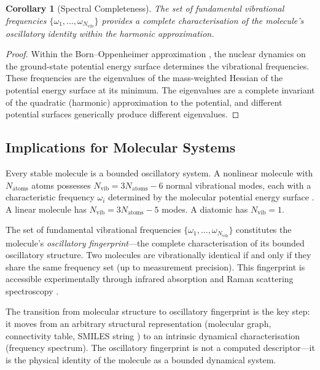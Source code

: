 \documentclass[11pt,a4paper]{article}
\newtheorem{corollary}[theorem]{Corollary}
\theoremstyle{definition}
\theoremstyle{remark}
\newcommand{\Nvib}{N_{\mathrm{vib}}}
\begin{document}
\begin{corollary}[Spectral Completeness]
\label{cor:spectral_complete}
The set of fundamental vibrational frequencies $\{\omega_1, \ldots, \omega_{\Nvib}\}$ provides a complete characterisation of the molecule's oscillatory identity within the harmonic approximation.
\end{corollary}

\begin{proof}
Within the Born--Oppenheimer approximation \citep{born1927}, the nuclear dynamics on the ground-state potential energy surface determines the vibrational frequencies. These frequencies are the eigenvalues of the mass-weighted Hessian of the potential energy surface at its minimum. The eigenvalues are a complete invariant of the quadratic (harmonic) approximation to the potential, and different potential surfaces generically produce different eigenvalues.
\end{proof}

\subsection{Implications for Molecular Systems}

Every stable molecule is a bounded oscillatory system. A nonlinear molecule with $N_{\mathrm{atoms}}$ atoms possesses $\Nvib = 3N_{\mathrm{atoms}} - 6$ normal vibrational modes, each with a characteristic frequency $\omega_i$ determined by the molecular potential energy surface \citep{wilson1955}. A linear molecule has $\Nvib = 3N_{\mathrm{atoms}} - 5$ modes. A diatomic has $\Nvib = 1$.

The set of fundamental vibrational frequencies $\{\omega_1, \ldots, \omega_{\Nvib}\}$ constitutes the molecule's \emph{oscillatory fingerprint}---the complete characterisation of its bounded oscillatory structure. Two molecules are vibrationally identical if and only if they share the same frequency set (up to measurement precision). This fingerprint is accessible experimentally through infrared absorption and Raman scattering spectroscopy \citep{wilson1955, herzberg1945}.

The transition from molecular structure to oscillatory fingerprint is the key step: it moves from an arbitrary structural representation (molecular graph, connectivity table, SMILES string \citep{weininger1988}) to an intrinsic dynamical characterisation (frequency spectrum). The oscillatory fingerprint is not a computed descriptor---it is the physical identity of the molecule as a bounded dynamical system.
\end{document}
